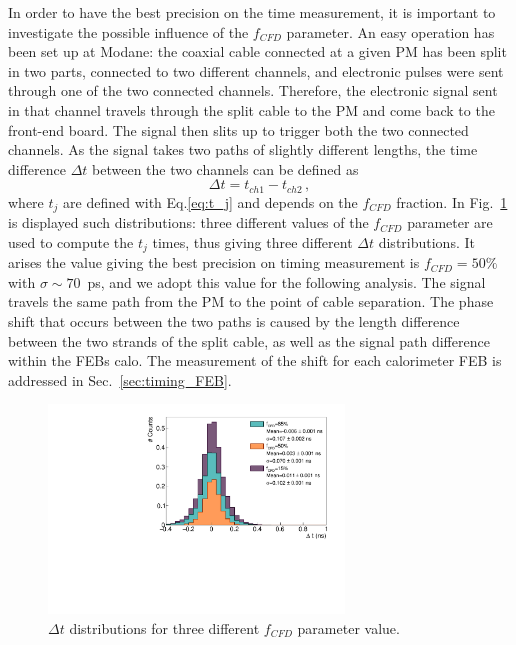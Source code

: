 In order to have the best precision on the time measurement, it is important to investigate the possible influence of the $f_{CFD}$ parameter.
An easy operation has been set up at Modane: the coaxial cable connected at a given PM has been split in two parts, connected to two different channels, and electronic pulses were sent through one of the two connected channels.
Therefore, the electronic signal sent in that channel travels through the split cable to the PM and come back to the front-end board.
The signal then slits up to trigger both the two connected channels.
As the signal takes two paths of slightly different lengths, the time difference $\Delta t$ between the two channels can be defined as
\begin{equation}
  \Delta t = t_{ch1}-t_{ch2}\,,
\end{equation}
where $t_{j}$ are defined with Eq.\eqref{eq:t_j} and depends on the $f_{CFD}$ fraction.
In Fig.~\ref{fig:deltat_CFD} is displayed such distributions: three different values of the $f_{CFD}$ parameter are used to compute the $t_{j}$ times, thus giving three different $\Delta t$ distributions.
It arises the value giving the best precision on timing measurement is $f_{CFD} = 50\%$ with $\sigma\sim70$~ps, and we adopt this value for the following analysis.
The signal travels the same path from the PM to the point of cable separation.
The phase shift that occurs between the two paths is caused by the length difference between the two strands of the split cable, as well as the signal path difference within the FEBs calo.
The measurement of the shift for each calorimeter FEB is addressed in Sec.~\ref{sec:timing_FEB}.
\begin{figure}[h!]
  \centering
  \includegraphics[width=0.7\textwidth]{commissioning/fig_commissioning/deltat.pdf}
  \caption{$\Delta t$ distributions for three different $f_{CFD}$ parameter value.
    \label{fig:deltat_CFD}}
\end{figure}
